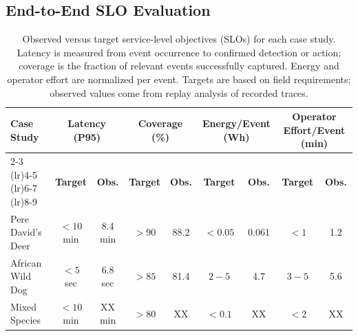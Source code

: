 \documentclass[letterpaper,twocolumn,10pt]{article}
\begin{document}

\subsection{End-to-End SLO Evaluation}

\begin{table}[t]
\centering
\begin{tabular}{p{2.7cm} cc cc cc cc}
\toprule
\multirow{2}{*}{\textbf{Case Study}}
& \multicolumn{2}{c}{\textbf{Latency (P95)}}
& \multicolumn{2}{c}{\textbf{Coverage (\%)}}
& \multicolumn{2}{c}{\textbf{Energy/Event (Wh)}}
& \multicolumn{2}{c}{\textbf{Operator Effort/Event (min)}} \\
\cmidrule(lr){2-3} \cmidrule(lr){4-5} \cmidrule(lr){6-7} \cmidrule(lr){8-9}
& \textbf{Target} & \textbf{Obs.} & \textbf{Target} & \textbf{Obs.} & \textbf{Target} & \textbf{Obs.} & \textbf{Target} & \textbf{Obs.} \\
\midrule
Pere David's Deer & $<10$ min & 8.4 min & $>90$ & 88.2 & $<0.05$ & 0.061 & $<1$ & 1.2 \\
African Wild Dog & $<5$ sec & 6.8 sec & $>85$ & 81.4 & $2{-}5$ & 4.7 & $3{-}5$ & 5.6 \\
Mixed Species & $<10$ min & XX min & $>80$ & XX & $<0.1$ & XX & $<2$ & XX \\
\bottomrule
\end{tabular}
\caption{Observed versus target service-level objectives (SLOs) for each case study. Latency is measured from event occurrence to confirmed detection or action; coverage is the fraction of relevant events successfully captured. Energy and operator effort are normalized per event. Targets are based on field requirements; observed values come from replay analysis of recorded traces.}
\label{table:slos_eval}
\end{table}
\end{document}
